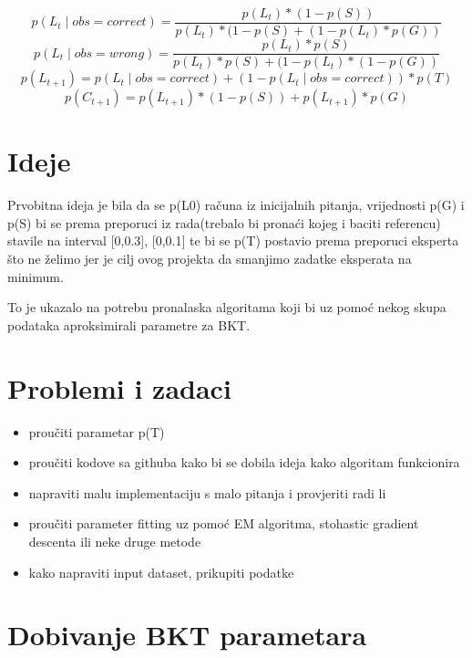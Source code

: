 \documentclass[times, utf8,projekt]{fer}
\begin{document}
\begin{equation}
 p(L_t\mid obs=correct)=\frac{p(L_t)*(1-p(S))}{p(L_t)*(1-p(S)+(1-p(L_t)*p(G))}
\end{equation}\newline
\begin{equation}
 p(L_t\mid obs=wrong)=\frac{p(L_t)*p(S)}{p(L_t)*p(S)+(1-p(L_t)*(1-p(G))}
\end{equation}\newline
\begin{equation}
 p(L_{t+1})=p(L_t\mid obs=correct) + (1-p(L_t\mid obs=correct))*p(T)
\end{equation}\newline
\begin{equation}
 p(C_{t+1})=p(L_{t+1}) * (1-p(S)) + p(L_{t+1})*p(G)
\end{equation}

\section{Ideje}
Prvobitna ideja je bila da se p(L0) računa iz inicijalnih pitanja, vrijednosti p(G) i p(S) bi se prema preporuci iz rada(trebalo bi pronaći kojeg i baciti referencu) stavile na interval [0,0.3], [0,0.1] te bi se p(T) postavio prema preporuci eksperta što ne želimo jer je cilj ovog projekta da smanjimo zadatke eksperata na minimum.

To je ukazalo na potrebu pronalaska algoritama koji bi uz pomoć nekog skupa podataka aproksimirali parametre za BKT.
\section{Problemi i zadaci}
\begin{itemize}
	\item proučiti parametar p(T)
	\item proučiti kodove sa githuba kako bi se dobila ideja kako algoritam funkcionira
	\item napraviti malu implementaciju s malo pitanja i provjeriti radi li
	\item proučiti parameter fitting uz pomoć EM algoritma, stohastic gradient descenta ili neke druge metode
	\item kako napraviti input dataset, prikupiti podatke
	
	
\end{itemize}
\section{Dobivanje BKT parametara}
\end{document}
